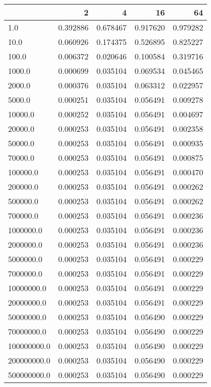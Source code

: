 \begin{tabular}{lrrrr}
\toprule
{} &        2  &        4  &        16 &        64 \\
\midrule
1.0         &  0.392886 &  0.678467 &  0.917620 &  0.979282 \\
10.0        &  0.060926 &  0.174375 &  0.526895 &  0.825227 \\
100.0       &  0.006372 &  0.020646 &  0.100584 &  0.319716 \\
1000.0      &  0.000699 &  0.035104 &  0.069534 &  0.045465 \\
2000.0      &  0.000376 &  0.035104 &  0.063312 &  0.022957 \\
5000.0      &  0.000251 &  0.035104 &  0.056491 &  0.009278 \\
10000.0     &  0.000252 &  0.035104 &  0.056491 &  0.004697 \\
20000.0     &  0.000253 &  0.035104 &  0.056491 &  0.002358 \\
50000.0     &  0.000253 &  0.035104 &  0.056491 &  0.000935 \\
70000.0     &  0.000253 &  0.035104 &  0.056491 &  0.000875 \\
100000.0    &  0.000253 &  0.035104 &  0.056491 &  0.000470 \\
200000.0    &  0.000253 &  0.035104 &  0.056491 &  0.000262 \\
500000.0    &  0.000253 &  0.035104 &  0.056491 &  0.000262 \\
700000.0    &  0.000253 &  0.035104 &  0.056491 &  0.000236 \\
1000000.0   &  0.000253 &  0.035104 &  0.056491 &  0.000236 \\
2000000.0   &  0.000253 &  0.035104 &  0.056491 &  0.000236 \\
5000000.0   &  0.000253 &  0.035104 &  0.056491 &  0.000229 \\
7000000.0   &  0.000253 &  0.035104 &  0.056491 &  0.000229 \\
10000000.0  &  0.000253 &  0.035104 &  0.056491 &  0.000229 \\
20000000.0  &  0.000253 &  0.035104 &  0.056491 &  0.000229 \\
50000000.0  &  0.000253 &  0.035104 &  0.056490 &  0.000229 \\
70000000.0  &  0.000253 &  0.035104 &  0.056490 &  0.000229 \\
100000000.0 &  0.000253 &  0.035104 &  0.056490 &  0.000229 \\
200000000.0 &  0.000253 &  0.035104 &  0.056490 &  0.000229 \\
500000000.0 &  0.000253 &  0.035104 &  0.056490 &  0.000229 \\
\bottomrule
\end{tabular}
